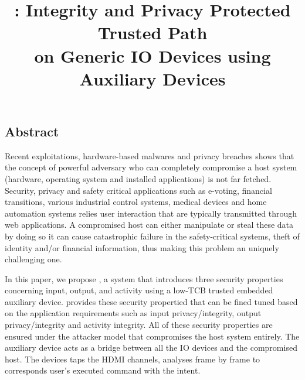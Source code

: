 

\newif\ifpaper
\papertrue


\newif\ifdesperatetime

\graphicspath{{images/}}


\title{\Large \bf \name: Integrity and Privacy Protected Trusted Path \\on Generic IO Devices using Auxiliary Devices}

\iffalse
\author{\IEEEauthorblockN{Aritra Dhar}
\IEEEauthorblockA{ETH Z{\"u}rich\\
aritra.dhar@inf.ethz.ch}
}
\fi
\maketitle
\subsection*{Abstract}

Recent exploitations, hardware-based malwares and privacy breaches shows that the concept of powerful adversary who can completely compromise a host system (hardware, operating system and installed applications) is not far fetched. Security, privacy and safety critical applications such as e-voting, financial transitions, various industrial control systems, medical devices and home automation systems relies user interaction that are typically transmitted through web applications. A compromised host can either manipulate or steal these data by doing so it can cause catastrophic failure in the safety-critical systems, theft of identity and/or financial information, thus making this problem an uniquely challenging one.

In this paper, we propose \name, a system that introduces three security properties concerning input, output, and activity using a low-TCB trusted embedded auxiliary device. \name provides these security propertied that can be fined tuned based on the application requirements such as input privacy/integrity, output privacy/integrity and activity integrity. All of these security properties are ensured under the attacker model that compromises the host system entirely. The auxiliary device acts as a bridge between all the IO devices and the compromised host. The devices taps the HDMI channels, analyses frame by frame to corresponds user's executed command with the intent. 









{\normalsize  

}


